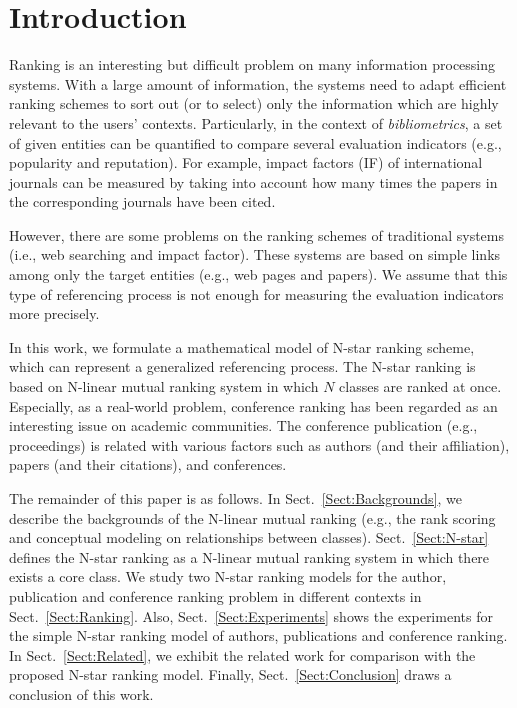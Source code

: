 \documentclass[10pt,leqno,twoside]{article}
\begin{document}
\section{Introduction}
Ranking is an interesting but difficult problem on many information processing systems. With a large amount of information, the systems need to adapt efficient ranking schemes to sort out (or to select) only the information which are highly relevant to the users' contexts.
Particularly, in the context of \emph{bibliometrics}, %
a set of given entities can be quantified to compare several evaluation indicators (e.g., popularity and reputation). For example, impact factors (IF) of international journals can be measured by taking into account how many times the papers in the corresponding journals have been cited.


However, there are some problems on the ranking schemes of traditional systems (i.e., web searching and impact factor).
These systems are based on simple links among only the target entities (e.g., web pages and papers).
We assume that this type of referencing process is not enough for measuring the evaluation indicators more precisely.

In this work, we formulate a mathematical model of N-star ranking scheme, which can represent a generalized referencing process.
The N-star ranking is based on N-linear mutual ranking system in which $N$ classes are ranked at once.
Especially, as a real-world problem,
conference ranking has been regarded as an interesting issue on academic communities.
The conference publication (e.g., proceedings) is related with various factors
such as authors (and their affiliation), papers (and their citations), and conferences.


The remainder of this paper is as follows.
In Sect.~\ref{Sect:Backgrounds}, we describe the backgrounds of the N-linear mutual ranking (e.g., the rank scoring and conceptual modeling on relationships between classes).
Sect.~\ref{Sect:N-star} defines the N-star ranking as a N-linear mutual ranking system in which there exists a core class.
We study two N-star ranking models for the author, publication and conference ranking problem in different contexts in Sect.~\ref{Sect:Ranking}.
Also, Sect.~\ref{Sect:Experiments} shows the experiments for the simple N-star ranking model of authors, publications and conference ranking.
In Sect.~\ref{Sect:Related}, we exhibit the related work for comparison with the proposed N-star ranking model. Finally, Sect.~\ref{Sect:Conclusion} draws a conclusion of this work.
\end{document}
